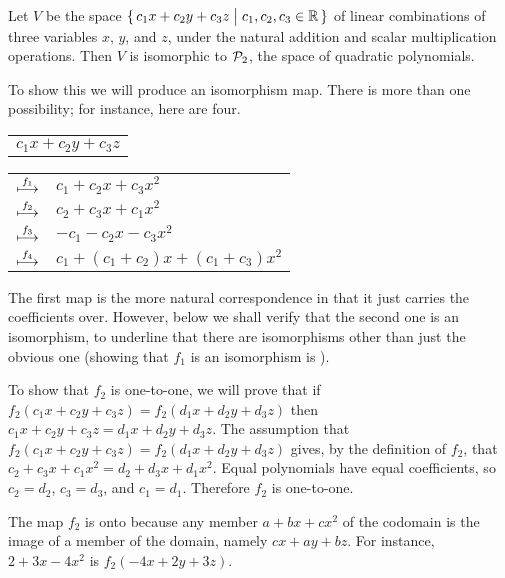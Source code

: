 \begin{example} \label{ex:LinComboThreeIsoPTwo}
Let \( V \) be the space 
\( \mbox{$\{\,c_1x+c_2y+c_3z\bigm| c_1,c_2,c_3\in\mathbb{R}\,\}$} \)
of linear combinations of three variables $x$, $y$, and $z$, 
under the natural addition and scalar multiplication operations. 
Then $V$ is isomorphic to $\mathcal{P}_2$, the space of quadratic 
polynomials.

To show this we will produce an isomorphism map.
There is more than one possibility; for instance, here are four.
\begin{center}
  \begin{tabular}{c}
    $c_1x+c_2y+c_3z$
  \end{tabular}  \quad
  \begin{tabular}{rl}
      $\stackrel{f_1}{\longmapsto}$    &$c_1+c_2x+c_3x^2$  \\
      $\stackrel{f_2}{\longmapsto}$    &$c_2+c_3x+c_1x^2$  \\
      $\stackrel{f_3}{\longmapsto}$    &$-c_1-c_2x-c_3x^2$  \\
      $\stackrel{f_4}{\longmapsto}$    &$c_1+(c_1+c_2)x+(c_1+c_3)x^2$
  \end{tabular}
\end{center}
The first map is the more natural correspondence
in that it just carries the coefficients over. 
However, below
we shall verify that the second one is an isomorphism,
to underline that there are isomorphisms
other than just the obvious one 
(showing that $f_1$ is an isomorphism is 
).

To show that $f_2$ is one-to-one, we will prove that if
$f_2(c_1x+c_2y+c_3z)=f_2(d_1x+d_2y+d_3z)$
then $c_1x+c_2y+c_3z=d_1x+d_2y+d_3z$.
The assumption that $f_2(c_1x+c_2y+c_3z)=f_2(d_1x+d_2y+d_3z)$
gives, by the definition of $f_2$, 
that $c_2+c_3x+c_1x^2=d_2+d_3x+d_1x^2$.
Equal polynomials have equal coefficients, so 
$c_2=d_2$, $c_3=d_3$, and $c_1=d_1$.
Therefore $f_2$ is one-to-one.

The map $f_2$ is onto because any member $a+bx+cx^2$ of the codomain 
is the image of a member of the domain, namely
$cx+ay+bz$.
For instance, $2+3x-4x^2$ is $f_2(-4x+2y+3z)$.


\end{example}

